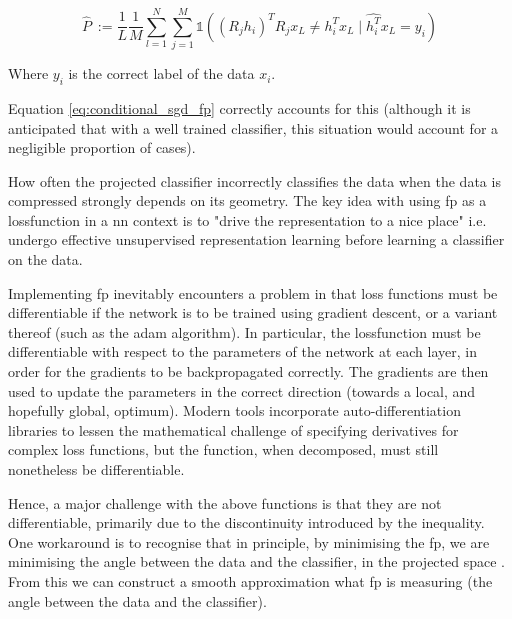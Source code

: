 \begin{equation}
\label{eq:conditional_sgd_fp}
\hat{P}\ := \frac{1}{L}\frac{1}{M}\sum_{l = 1}^N \sum_{j = 1}^M  \mathds{1}( (R_j h_i)^T R_jx_L \neq h_i^Tx_L \mid \hat{h_i^T}x_L = y_i )  
\end{equation}

Where $y_i$ is the correct label of the data $x_i$. 
\bigskip

Equation \ref{eq:conditional_sgd_fp} correctly accounts for this (although it is anticipated that with a well trained classifier, this situation would account for a negligible proportion of cases). 
\bigskip

How often the projected classifier incorrectly classifies the data when the data is compressed strongly depends on its geometry. The key idea with using \gls{fp} as a \gls{lossfunction} in a \gls{nn} context is to "drive the representation to a nice place" i.e. undergo effective unsupervised representation learning before learning a classifier on the data. 
\bigskip


Implementing  \gls{fp} inevitably encounters a problem in that loss functions must be differentiable if the network is to be trained using gradient descent, or a variant thereof (such as the \gls{adam} algorithm). In particular, the \gls{lossfunction} must be differentiable with respect to the parameters of the network at each layer, in order for the gradients to be backpropagated correctly. The gradients are then used to update the parameters in the correct direction (towards a local, and hopefully global, optimum). Modern tools incorporate auto-differentiation libraries to lessen the mathematical challenge of specifying derivatives for complex loss functions, but the function, when decomposed, must still nonetheless be differentiable.
\bigskip


Hence, a major challenge with the above functions is that they are not differentiable, primarily due to the discontinuity introduced by the inequality. One workaround is to recognise that in principle, by minimising the \gls{fp}, we are minimising the angle between the data and the classifier, in the projected space \cite[p.~3]{bob_rp_storage}. From this we can construct a smooth approximation what \gls{fp} is measuring (the angle between the data and the classifier).

